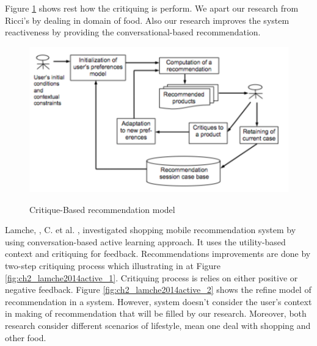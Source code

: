 Figure \ref{fig:ch2_ricci2005critique} shows rest how the critiquing is perform. We apart our research from Ricci’s by dealing in domain of food. Also our research improves the system reactiveness by providing the conversational-based recommendation. \newline

\begin{figure}[h]
	\centering
	\includegraphics[width=.50\linewidth]{figures/ch2_ricci2005critique.png}
	\caption{Critique-Based recommendation model}
	\cite{ricci2005critique}
	\label{fig:ch2_ricci2005critique}
\end{figure}


Lamche, , C. et al. \cite{lamche2014active}, investigated shopping mobile recommendation system by using conversation-based active learning approach. It uses the utility-based context and critiquing for feedback. Recommendations improvements are done by two-step critiquing process which illustrating in at Figure \ref{fig:ch2_lamche2014active_1}. Critiquing process is relies on either positive or negative feedback. Figure \ref{fig:ch2_lamche2014active_2} shows the refine model of recommendation in a system.  However, system doesn’t consider the user’s context in making of recommendation that will be filled by our research.  Moreover, both research consider different scenarios of lifestyle, mean one deal with shopping and other food.

